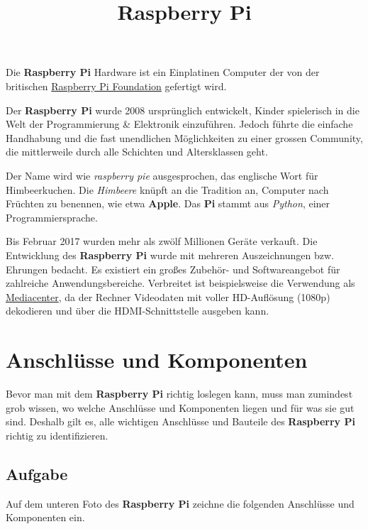 \documentclass[10pt]{article}
\newcommand{\rp}{\textbf{Raspberry Pi}\xspace}
\begin{document}
\title{Raspberry Pi}
\maketitle

Die \rp Hardware ist ein Einplatinen Computer der von der britischen \href{https://www.raspberrypi.org/}{Raspberry Pi Foundation} gefertigt wird.

Der \rp wurde 2008 ursprünglich entwickelt, Kinder spielerisch in die Welt der Programmierung \& Elektronik einzuführen. Jedoch führte die einfache Handhabung und die fast unendlichen Möglichkeiten zu einer grossen Community, die mittlerweile durch alle Schichten und Altersklassen geht.

Der Name wird wie \textit{raspberry pie} ausgesprochen, das englische Wort für Himbeerkuchen. Die \textit{Himbeere} knüpft an die Tradition an, Computer nach Früchten zu benennen, wie etwa \textbf{Apple}. Das \textbf{Pi} stammt aus \textit{Python}, einer Programmiersprache.

Bis Februar 2017 wurden mehr als zwölf Millionen Geräte verkauft. Die Entwicklung des \textbf{Raspberry Pi} wurde mit mehreren Auszeichnungen bzw. Ehrungen bedacht. Es existiert ein großes Zubehör- und Softwareangebot für zahlreiche Anwendungsbereiche. Verbreitet ist beispielsweise die Verwendung als \href{https://www.youtube.com/watch?v=YPu7oSVbMVo}{Mediacenter}, da der Rechner Videodaten mit voller HD-Auflösung (1080p) dekodieren und über die HDMI-Schnittstelle ausgeben kann. 

\section{Anschlüsse und Komponenten}

Bevor man mit dem \rp richtig loslegen kann, muss man zumindest grob wissen, wo welche Anschlüsse und Komponenten liegen und für was sie gut sind. Deshalb gilt es, alle wichtigen Anschlüsse und Bauteile des \rp richtig zu identifizieren.

\subsection{Aufgabe}

Auf dem unteren Foto des \rp zeichne die folgenden Anschlüsse und Komponenten ein.
\end{document}
